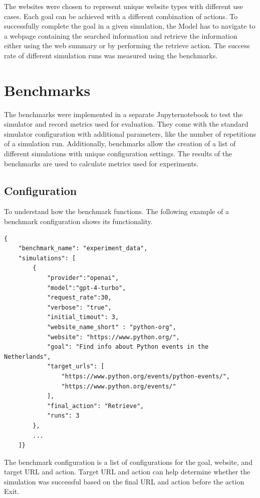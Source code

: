 The websites were chosen to represent unique website types with different use cases. Each goal can be achieved with a different combination of actions. To successfully complete the goal in a given simulation, the Model has to navigate to a webpage containing the searched information and retrieve the information either using the web summary or by performing the retrieve action. The success rate of different simulation runs was measured using the benchmarks.

\section{Benchmarks}
\label{benchmark}

The benchmarks were implemented in a separate Jupyternotebook to test the simulator and record metrics used for evaluation. They come with the standard simulator configuration with additional parameters, like the number of repetitions of a simulation run. Additionally, benchmarks allow the creation of a list of different simulations with unique configuration settings. The results of the benchmarks are used to calculate metrics used for experiments. 

\subsection{Configuration}

To understand how the benchmark functions. The following example of a benchmark configuration shows its functionality.

\begin{verbatim}
{
    "benchmark_name": "experiment_data",
    "simulations": [
        {
            "provider":"openai",
            "model":"gpt-4-turbo",
            "request_rate":30,
            "verbose": "true",
            "initial_timout": 3,
            "website_name_short" : "python-org",
            "website": "https://www.python.org/",
            "goal": "Find info about Python events in the Netherlands",
            "target_urls": [
                "https://www.python.org/events/python-events/",
                "https://www.python.org/events/"
            ],
            "final_action": "Retrieve",
            "runs": 3
        },
        ... 
    ]}
\end{verbatim}

The benchmark configuration is a list of configurations for the goal, website, and target URL and action. Target URL and action can help determine whether the simulation was successful based on the final URL and action before the action Exit.

